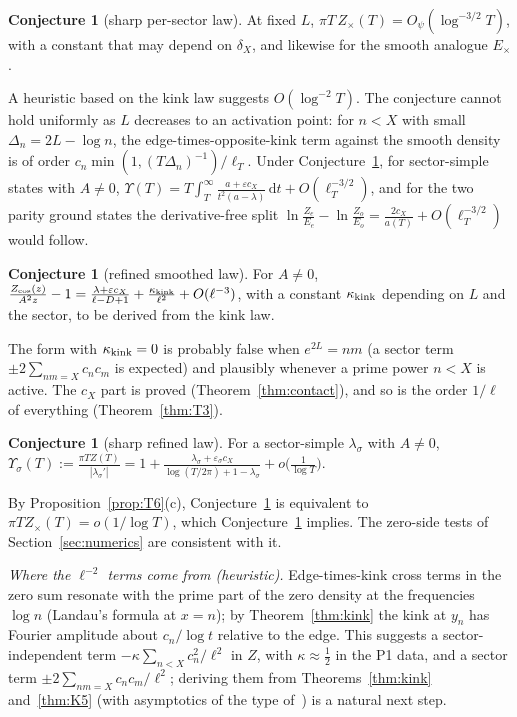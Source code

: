 \documentclass[11pt]{amsart}
\newcommand{\dd}{\,\mathrm{d}}
\newcommand{\eps}{\varepsilon}
\theoremstyle{definition}
\newtheorem{conjecture}[theorem]{Conjecture}
\theoremstyle{remark}
\numberwithin{equation}{section}
\begin{document}
\begin{conjecture}[sharp per-sector law]\label{conj:L}
At fixed $L$, $\pi T\,Z_\times(T)=O_\psi(\log^{-3/2}T)$, with a constant that may depend on $\delta_X$, and likewise for the smooth analogue $E_\times$.
\end{conjecture}

A heuristic based on the kink law suggests $O(\log^{-2}T)$. The conjecture cannot hold uniformly as $L$ decreases to an activation point: for $n<X$ with small $\Delta_n=2L-\log n$, the edge-times-opposite-kink term against the smooth density is of order $c_n\min(1,(T\Delta_n)^{-1})/\ell_T$. Under Conjecture~\ref{conj:L}, for sector-simple states with $A\ne0$, $\Upsilon(T)=T\int_T^\infty\frac{a+\eps c_X}{t^2(a-\lambda)}\dd t+O(\ell_T^{-3/2})$, and for the two parity ground states the derivative-free split $\ln\frac{Z_e}{E_e}-\ln\frac{Z_o}{E_o}=\frac{2c_X}{a(T)}+O(\ell_T^{-3/2})$ would follow.

\begin{conjecture}[refined smoothed law]\label{conj:R}
For $A\ne0$, $\frac{Z_{\cos}(z)}{A^2z}-1=\frac{\lambda+\eps c_X}{\ell-D+1}+\frac{\kappa_{\rm kink}}{\ell^2}+O(\ell^{-3})$, with a constant $\kappa_{\rm kink}$ depending on $L$ and the sector, to be derived from the kink law.
\end{conjecture}

The form with $\kappa_{\rm kink}=0$ is probably false when $e^{2L}=nm$ (a sector term $\pm2\sum_{nm=X}c_nc_m$ is expected) and plausibly whenever a prime power $n<X$ is active. The $c_X$ part is proved (Theorem~\ref{thm:contact}), and so is the order $1/\ell$ of everything (Theorem~\ref{thm:T3}).

\begin{conjecture}[sharp refined law]\label{pred:F}
For a sector-simple $\lambda_\sigma$ with $A\ne0$, $\Upsilon_\sigma(T):=\frac{\pi TZ(T)}{|\lambda_\sigma'|}=1+\frac{\lambda_\sigma+\eps_\sigma c_X}{\log(T/2\pi)+1-\lambda_\sigma}+o\bigl(\frac1{\log T}\bigr)$.
\end{conjecture}

By Proposition~\ref{prop:T6}(c), Conjecture~\ref{pred:F} is equivalent to $\pi TZ_\times(T)=o(1/\log T)$, which Conjecture~\ref{conj:L} implies. The zero-side tests of Section~\ref{sec:numerics} are consistent with it.

\emph{Where the $\ell^{-2}$ terms come from (heuristic).} Edge-times-kink cross terms in the zero sum resonate with the prime part of the zero density at the frequencies $\log n$ (Landau's formula at $x=n$); by Theorem~\ref{thm:kink} the kink at $y_n$ has Fourier amplitude about $c_n/\log t$ relative to the edge. This suggests a sector-independent term $-\kappa\sum_{n<X}c_n^2/\ell^2$ in $Z$, with $\kappa\approx\frac12$ in the P1 data, and a sector term $\pm2\sum_{nm=X}c_nc_m/\ell^2$; deriving them from Theorems~\ref{thm:kink} and~\ref{thm:K5} (with asymptotics of the type of~\cite{WL78}) is a natural next step.
\end{document}
